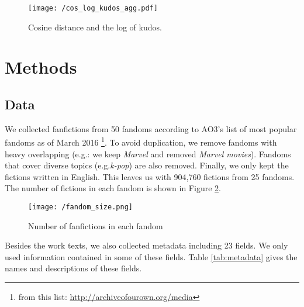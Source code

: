 \documentclass[11pt]{article} %
\begin{document}
\begin{figure}[htbp]
\begin{center}
\texttt{[image: /cos\_log\_kudos\_agg.pdf]}
\caption{Cosine distance and the log of kudos.}
\label{fig:cos_kudos}
\end{center}
\end{figure}







\section{Methods} %
\label{sec:methods}


\subsection{Data}
We collected fanfictions from 50 fandoms according to AO3's list of most popular fandoms as of March 2016 \footnote{from this list: \url{http://archiveofourown.org/media}}. To avoid duplication, we remove fandoms with heavy overlapping (e.g.: we keep \emph{Marvel} and removed \emph{Marvel movies}). Fandoms that cover diverse topics (e.g.\emph{k-pop}) are also removed. Finally, we only kept the fictions written in English. This leaves us with 904,760 fictions from 25 fandoms. The number of fictions in each fandom is shown in Figure \ref{fig:fandom_size}.

\begin{figure}[htbp]
\begin{center}
\texttt{[image: /fandom\_size.png]}
\caption{Number of fanfictions in each fandom}
\label{fig:fandom_size}
\end{center}
\end{figure}


Besides the work texts, we also collected metadata including 23 fields. We only used information contained in some of these fields. Table \ref{tab:metadata} gives the names and descriptions of these fields. 
\end{document}
